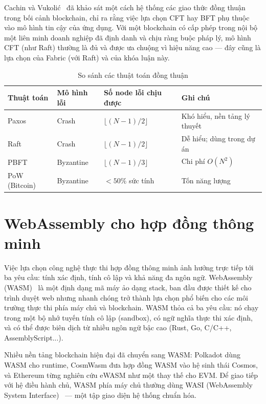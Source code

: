 Cachin và Vukoli\'c~\cite{cachin2017blockchain} đã khảo sát một cách hệ thống
các giao thức đồng thuận trong bối cảnh blockchain, chỉ ra rằng việc lựa chọn
CFT hay BFT phụ thuộc vào mô hình tin cậy của ứng dụng. Với một blockchain có
cấp phép trong nội bộ một liên minh doanh nghiệp đã định danh và chịu ràng buộc
pháp lý, mô hình CFT (như Raft) thường là đủ và được ưa chuộng vì hiệu năng cao
--- đây cũng là lựa chọn của Fabric (với Raft) và của khóa luận này.

\begin{table}[H]
\centering
\caption{So sánh các thuật toán đồng thuận}
\label{tab:consensus-compare}
\begin{tabular}{@{}p{2.4cm}p{2.2cm}p{2.6cm}p{3.4cm}@{}}
\toprule
\textbf{Thuật toán} & \textbf{Mô hình lỗi} & \textbf{Số node lỗi chịu được} & \textbf{Ghi chú} \\
\midrule
Paxos & Crash & $\lfloor(N-1)/2\rfloor$ & Khó hiểu, nền tảng lý thuyết \\
Raft & Crash & $\lfloor(N-1)/2\rfloor$ & Dễ hiểu; dùng trong dự án \\
PBFT & Byzantine & $\lfloor(N-1)/3\rfloor$ & Chi phí $O(N^2)$ \\
PoW (Bitcoin) & Byzantine & $<50\%$ sức tính & Tốn năng lượng \\
\bottomrule
\end{tabular}
\end{table}

\section{WebAssembly cho hợp đồng thông minh}
\label{sec:wasm-related}

Việc lựa chọn công nghệ thực thi hợp đồng thông minh ảnh hưởng trực tiếp tới ba
yêu cầu: tính xác định, tính cô lập và khả năng đa ngôn ngữ.
WebAssembly (WASM)~\cite{haas2017wasm,wasmspec} là một định dạng mã máy
ảo dạng stack, ban đầu được thiết kế cho trình duyệt web nhưng nhanh chóng trở
thành lựa chọn phổ biến cho các môi trường thực thi phía máy chủ và blockchain.
WASM thỏa cả ba yêu cầu: nó chạy trong một bộ nhớ tuyến tính cô lập (sandbox), có
ngữ nghĩa thực thi xác định, và có thể được biên dịch từ nhiều ngôn ngữ bậc cao
(Rust, Go, C/C++, AssemblyScript...).

Nhiều nền tảng blockchain hiện đại đã chuyển sang WASM: Polkadot dùng WASM cho
runtime, CosmWasm đưa hợp đồng WASM vào hệ sinh thái Cosmos, và Ethereum từng
nghiên cứu eWASM như một thay thế cho EVM. Để giao tiếp với hệ điều hành chủ,
WASM phía máy chủ thường dùng WASI (WebAssembly System
Interface)~\cite{wasi} --- một tập giao diện hệ thống chuẩn hóa.

